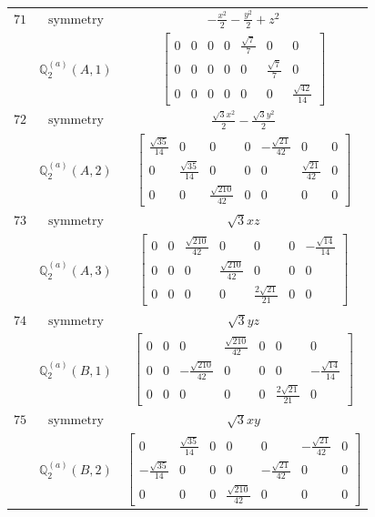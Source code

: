 \documentclass[fleqn,8pt,landscape]{jsarticle}
\begin{document}
\begin{longtable}{ccc}
$ 71 $ & $ \text{symmetry} $ & $ - \frac{x^{2}}{2} - \frac{y^{2}}{2} + z^{2} $ \\
$  $ & $ \mathbb{Q}_{2}^{(a)}(A,1) $ & $ \begin{bmatrix} 0 & 0 & 0 & 0 & \frac{\sqrt{7}}{7} & 0 & 0 \\ 0 & 0 & 0 & 0 & 0 & \frac{\sqrt{7}}{7} & 0 \\ 0 & 0 & 0 & 0 & 0 & 0 & \frac{\sqrt{42}}{14} \end{bmatrix} $ \\ \hline
$ 72 $ & $ \text{symmetry} $ & $ \frac{\sqrt{3} x^{2}}{2} - \frac{\sqrt{3} y^{2}}{2} $ \\
$  $ & $ \mathbb{Q}_{2}^{(a)}(A,2) $ & $ \begin{bmatrix} \frac{\sqrt{35}}{14} & 0 & 0 & 0 & - \frac{\sqrt{21}}{42} & 0 & 0 \\ 0 & \frac{\sqrt{35}}{14} & 0 & 0 & 0 & \frac{\sqrt{21}}{42} & 0 \\ 0 & 0 & \frac{\sqrt{210}}{42} & 0 & 0 & 0 & 0 \end{bmatrix} $ \\ \hline
$ 73 $ & $ \text{symmetry} $ & $ \sqrt{3} x z $ \\
$  $ & $ \mathbb{Q}_{2}^{(a)}(A,3) $ & $ \begin{bmatrix} 0 & 0 & \frac{\sqrt{210}}{42} & 0 & 0 & 0 & - \frac{\sqrt{14}}{14} \\ 0 & 0 & 0 & \frac{\sqrt{210}}{42} & 0 & 0 & 0 \\ 0 & 0 & 0 & 0 & \frac{2 \sqrt{21}}{21} & 0 & 0 \end{bmatrix} $ \\ \hline
$ 74 $ & $ \text{symmetry} $ & $ \sqrt{3} y z $ \\
$  $ & $ \mathbb{Q}_{2}^{(a)}(B,1) $ & $ \begin{bmatrix} 0 & 0 & 0 & \frac{\sqrt{210}}{42} & 0 & 0 & 0 \\ 0 & 0 & - \frac{\sqrt{210}}{42} & 0 & 0 & 0 & - \frac{\sqrt{14}}{14} \\ 0 & 0 & 0 & 0 & 0 & \frac{2 \sqrt{21}}{21} & 0 \end{bmatrix} $ \\ \hline
$ 75 $ & $ \text{symmetry} $ & $ \sqrt{3} x y $ \\
$  $ & $ \mathbb{Q}_{2}^{(a)}(B,2) $ & $ \begin{bmatrix} 0 & \frac{\sqrt{35}}{14} & 0 & 0 & 0 & - \frac{\sqrt{21}}{42} & 0 \\ - \frac{\sqrt{35}}{14} & 0 & 0 & 0 & - \frac{\sqrt{21}}{42} & 0 & 0 \\ 0 & 0 & 0 & \frac{\sqrt{210}}{42} & 0 & 0 & 0 \end{bmatrix} $ \\ \hline

\end{longtable}
\end{document}
